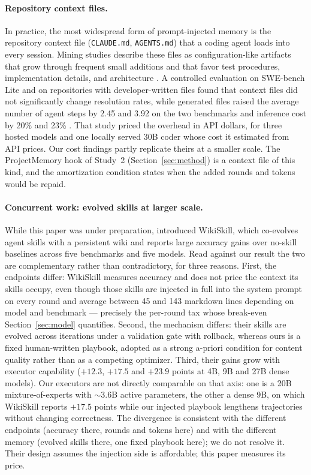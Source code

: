 \documentclass[smallcondensed,natbib]{svjour3}
\begin{document}
\paragraph{Repository context files.} In practice, the most widespread
form of prompt-injected memory is the repository context file
(\texttt{CLAUDE.md}, \texttt{AGENTS.md}) that a coding agent loads into
every session. Mining studies describe these files as
configuration-like artifacts that grow through frequent small
additions and that favor test procedures, implementation details,
and architecture
\citep{chatlatanagulchai2025manifests,chatlatanagulchai2026agentreadmes}.
A controlled evaluation on SWE-bench Lite and on repositories with
developer-written files found that context files did not significantly
change resolution rates, while generated files raised the average
number of agent steps by 2.45 and 3.92 on the two benchmarks and
inference cost by 20\% and 23\% \citep{gloaguen2026agentsmd}. That
study priced the overhead in API dollars, for three hosted models and
one locally served 30B coder whose cost it estimated from API prices.
Our cost findings partly replicate theirs at a smaller scale. The
ProjectMemory hook of Study~2 (Section~\ref{sec:method}) is a context
file of this kind, and the amortization condition states when the
added rounds and tokens would be repaid.

\paragraph{Concurrent work: evolved skills at larger scale.} While
this paper was under preparation, \citet{tang2026wikiskill} introduced
WikiSkill, which co-evolves agent skills with a persistent wiki and
reports large accuracy gains over no-skill baselines across five
benchmarks and five models. Read against our result the two are
complementary rather than contradictory, for three reasons. First, the
endpoints differ: WikiSkill measures accuracy and does not price the
context its skills occupy, even though those skills are injected in
full into the system prompt on every round and average between 45 and
143 markdown lines depending on model and benchmark --- precisely the
per-round tax whose break-even Section~\ref{sec:model} quantifies.
Second, the mechanism differs: their skills are evolved across
iterations under a validation gate with rollback, whereas ours is a
fixed human-written playbook, adopted as a strong a-priori condition
for content quality rather than as a competing optimizer. Third, their gains grow with executor capability ($+12.3$, $+17.5$ and
$+23.9$ points at 4B, 9B and 27B dense models). Our executors are not
directly comparable on that axis: one is a 20B mixture-of-experts with
$\sim$3.6B active parameters, the other a dense 9B, on which WikiSkill
reports $+17.5$ points while our injected playbook lengthens
trajectories without changing correctness. The divergence is consistent
with the different endpoints (accuracy there, rounds and tokens here)
and with the different memory (evolved skills there, one fixed playbook
here); we do not resolve it. Their design assumes the injection side is
affordable; this paper measures its price.
\end{document}
